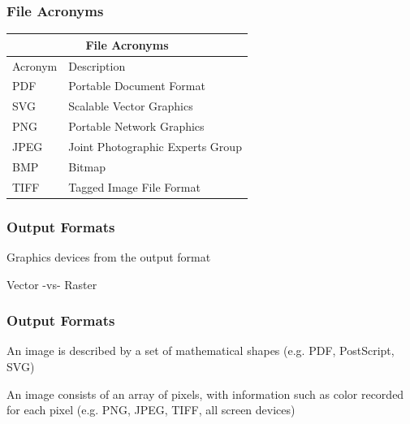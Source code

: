 \documentclass[12pt]{beamer}\usepackage[]{graphicx}\usepackage[]{color}
\begin{document}

\begin{frame}
\frametitle{File Acronyms}

\begin{center}
  \begin{tabular}{l l}
  \multicolumn{2}{c}{\textbf{File Acronyms}} \\
  \hline
  Acronym & Description \\
    \hline
    PDF & Portable Document Format \\
    SVG & Scalable Vector Graphics \\
    PNG & Portable Network Graphics \\
    JPEG & Joint Photographic Experts Group \\
    BMP & Bitmap \\
    TIFF & Tagged Image File Format \\
    \hline
 \end{tabular}
\end{center}

\end{frame}


\begin{frame}
\frametitle{Output Formats}

\centerline{\Large \mdlit Graphics devices from the output format}

\bigskip

\centerline{\Large Vector \quad -vs- \quad Raster}

\end{frame}


\begin{frame}
\frametitle{Output Formats}

An image is described by a set of mathematical shapes (e.g. PDF, PostScript, SVG)
\eb

An image consists of an array of pixels, with information such as color recorded for each pixel (e.g. PNG, JPEG, TIFF, all screen devices)
\eb

\end{frame}

\end{document}
